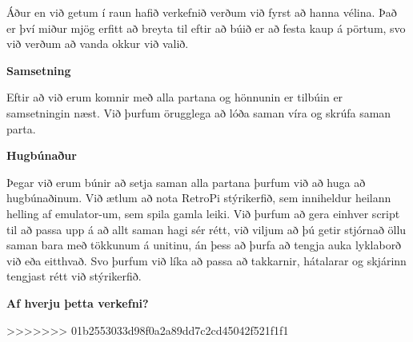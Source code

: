 Áður en við getum í raun hafið verkefnið verðum við fyrst að hanna vélina. Það er því miður mjög erfitt að breyta til eftir að búið er að festa kaup á pörtum, svo við verðum að vanda okkur við valið.

\textbf{Samsetning}

Eftir að við erum komnir með alla partana og hönnunin er tilbúin er samsetningin næst. Við þurfum örugglega að lóða saman víra og skrúfa saman parta.

\textbf{Hugbúnaður}

Þegar við erum búnir að setja saman alla partana þurfum við að huga að hugbúnaðinum. Við ætlum að nota RetroPi stýrikerfið, sem inniheldur heilann helling af emulator-um, sem spila gamla leiki. Við þurfum að gera einhver script til að passa upp á að allt saman hagi sér rétt, við viljum að þú getir stjórnað öllu saman bara með tökkunum á unitinu, án þess að þurfa að tengja auka lyklaborð við eða eitthvað. Svo þurfum við líka að passa að takkarnir, hátalarar og skjárinn tengjast rétt við stýrikerfið.

\textbf{Af hverju þetta verkefni?}

>>>>>>> 01b2553033d98f0a2a89dd7c2cd45042f521f1f1
